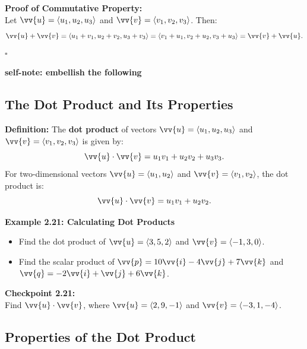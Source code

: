 \documentclass{article}
\begin{document}
\begin{proofbox}
    \textbf{Proof of Commutative Property:} \\
    Let \(\vv{u} = \langle u_1, u_2, u_3 \rangle\) and \(\vv{v} = \langle v_1, v_2, v_3 \rangle\). Then:
    \[
    \vv{u} + \vv{v} = \langle u_1 + v_1, u_2 + v_2, u_3 + v_3 \rangle = \langle v_1 + u_1, v_2 + u_2, v_3 + u_3 \rangle = \vv{v} + \vv{u}.
    \]
    \(\square\)
\end{proofbox}

\textbf{self-note: embellish the following}

\subsection*{The Dot Product and Its Properties}

\begin{definitionbox}
    \textbf{Definition:} The \textbf{dot product} of vectors \(\vv{u} = \langle u_1, u_2, u_3 \rangle\) and \(\vv{v} = \langle v_1, v_2, v_3 \rangle\) is given by:
    \[
    \vv{u} \cdot \vv{v} = u_1 v_1 + u_2 v_2 + u_3 v_3.
    \]
    For two-dimensional vectors \(\vv{u} = \langle u_1, u_2 \rangle\) and \(\vv{v} = \langle v_1, v_2 \rangle\), the dot product is:
    \[
    \vv{u} \cdot \vv{v} = u_1 v_1 + u_2 v_2.
    \]
\end{definitionbox}

\begin{examplebox}
    \textbf{Example 2.21: Calculating Dot Products} \\
    \begin{itemize}
        \item Find the dot product of \(\vv{u} = \langle 3, 5, 2 \rangle\) and \(\vv{v} = \langle -1, 3, 0 \rangle\).
        \item Find the scalar product of \(\vv{p} = 10\vv{i} - 4\vv{j} + 7\vv{k}\) and \(\vv{q} = -2\vv{i} + \vv{j} + 6\vv{k}\).
    \end{itemize}
\end{examplebox}

\begin{exercisebox}
    \textbf{Checkpoint 2.21:} \\
    Find \(\vv{u} \cdot \vv{v}\), where \(\vv{u} = \langle 2, 9, -1 \rangle\) and \(\vv{v} = \langle -3, 1, -4 \rangle\).
\end{exercisebox}

\subsection*{Properties of the Dot Product}
\end{document}

